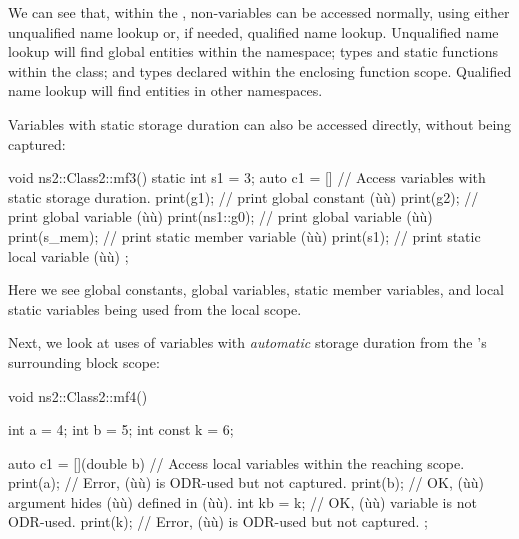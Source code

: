 We can see that, within the , non-variables can be
accessed normally, using either unqualified name lookup or, if needed,
qualified name lookup. Unqualified name lookup will find global entities
within the namespace; types and static functions within the class; and
types declared within the enclosing function scope. Qualified name
lookup will find entities in other namespaces.

Variables with static storage duration can also be accessed directly,
without being captured:

\begin{emcppslisting}
void ns2::Class2::mf3()
{
    static int s1 = 3;
    auto c1 = []{
        // Access variables with static storage duration.
        print(g1);      // print global constant (ù{}ù)
        print(g2);      // print global variable (ù{}ù)
        print(ns1::g0); // print global variable (ù{}ù)
        print(s_mem);   // print static member variable (ù{}ù)
        print(s1);      // print static local variable (ù{}ù)
    };
}
\end{emcppslisting}
    

Here we see global constants, global variables, static member variables,
and local static variables being used from the local scope.

Next, we look at uses of variables with \emph{automatic} storage
duration from the 's surrounding block scope:

\begin{emcppslisting}
void ns2::Class2::mf4()
{
    int       a = 4;
    int       b = 5;
    int const k = 6;

    auto c1 = [](double b) {
        // Access local variables within the reaching scope.
        print(a);    // Error, (ù{}ù) is ODR-used but not captured.
        print(b);    // OK, (ù{}ù) argument hides (ù{}ù) defined in (ù{}ù).
        int kb = k;  // OK, (ù{}ù) variable is not ODR-used.
        print(k);    // Error, (ù{}ù) is ODR-used but not captured.
    };
}
\end{emcppslisting}
    

